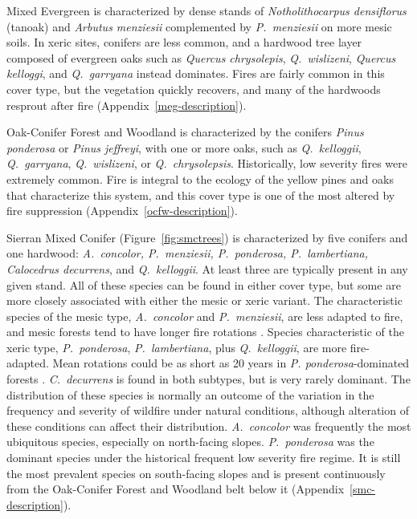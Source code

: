 Mixed Evergreen is characterized by dense stands of \emph{Notholithocarpus densiflorus} (tanoak) and \emph{Arbutus menziesii} complemented by \emph{P.~menziesii} on more mesic soils. In xeric sites, conifers are less common, and a hardwood tree layer composed of evergreen oaks such as \emph{Quercus chrysolepis}, \emph{Q.~wislizeni}, \emph{Quercus kelloggi}, and \emph{Q.~garryana} instead dominates. Fires are fairly common in this cover type, but the vegetation quickly recovers, and many of the hardwoods resprout after fire (Appendix~\ref{meg-description}). 

Oak-Conifer Forest and Woodland is characterized by the conifers \emph{Pinus ponderosa} or \emph{Pinus jeffreyi}, with one or more oaks, such as \emph{Q.~kelloggii}, \emph{Q.~garryana}, \emph{Q.~wislizeni}, or \emph{Q.~chrysolepsis}. Historically, low severity fires were extremely common. Fire is integral to the ecology of the yellow pines and oaks that characterize this system, and this cover type is one of the most altered by fire suppression (Appendix~\ref{ocfw-description}).

Sierran Mixed Conifer (Figure~\ref{fig:smctrees}) is characterized by five conifers and one hardwood: \emph{A.~concolor, P.~menziesii, P.~ponderosa, P.~lambertiana, Calocedrus decurrens}, and \emph{Q.~kelloggii}. At least three are typically present in any given stand. All of these species can be found in either cover type, but some are more closely associated with either the mesic or xeric variant. The characteristic species of the mesic type, \emph{A.~concolor} and \emph{P.~menziesii}, are less adapted to fire, and mesic forests tend to have longer fire rotations \citep{Mallek2013}. Species characteristic of the xeric type, \emph{P.~ponderosa}, \emph{P.~lambertiana}, plus \emph{Q.~kelloggii}, are more fire-adapted. Mean rotations could be as short as 20 years in \emph{P. ponderosa}-dominated forests \citep{Mallek2013}. \emph{C.~decurrens} is found in both subtypes, but is very rarely dominant. The distribution of these species is normally an outcome of the variation in the frequency and severity of wildfire under natural conditions, although alteration of these conditions can affect their distribution. \emph{A.~concolor} was frequently the most ubiquitous species, especially on north-facing slopes. \emph{P.~ponderosa} was the dominant species under the historical frequent low severity fire regime. It is still the most prevalent species on south-facing slopes and is present continuously from the Oak-Conifer Forest and Woodland belt below it (Appendix~\ref{smc-description}).

